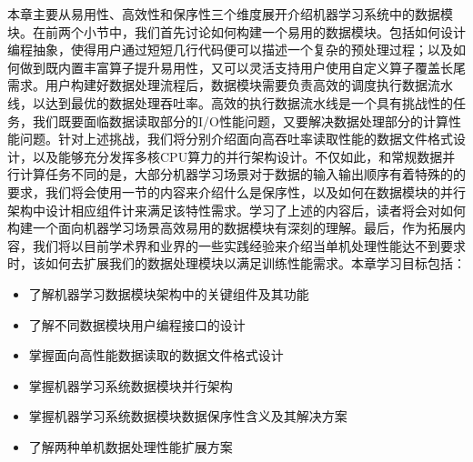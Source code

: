 \documentclass[letterpaper,10pt,english]{sphinxmanual}
\begin{document}
\sphinxAtStartPar
本章主要从易用性、高效性和保序性三个维度展开介绍机器学习系统中的数据模块。在前两个小节中，我们首先讨论如何构建一个易用的数据模块。包括如何设计编程抽象，使得用户通过短短几行代码便可以描述一个复杂的预处理过程；以及如何做到既内置丰富算子提升易用性，又可以灵活支持用户使用自定义算子覆盖长尾需求。用户构建好数据处理流程后，数据模块需要负责高效的调度执行数据流水线，以达到最优的数据处理吞吐率。高效的执行数据流水线是一个具有挑战性的任务，我们既要面临数据读取部分的I/O性能问题，又要解决数据处理部分的计算性能问题。针对上述挑战，我们将分别介绍面向高吞吐率读取性能的数据文件格式设计，以及能够充分发挥多核CPU算力的并行架构设计。不仅如此，和常规数据并行计算任务不同的是，大部分机器学习场景对于数据的输入输出顺序有着特殊的的要求，我们将会使用一节的内容来介绍什么是保序性，以及如何在数据模块的并行架构中设计相应组件计来满足该特性需求。学习了上述的内容后，读者将会对如何构建一个面向机器学习场景高效易用的数据模块有深刻的理解。最后，作为拓展内容，我们将以目前学术界和业界的一些实践经验来介绍当单机处理性能达不到要求时，该如何去扩展我们的数据处理模块以满足训练性能需求。本章学习目标包括：
\begin{itemize}
\item {} 
\sphinxAtStartPar
了解机器学习数据模块架构中的关键组件及其功能

\item {} 
\sphinxAtStartPar
了解不同数据模块用户编程接口的设计

\item {} 
\sphinxAtStartPar
掌握面向高性能数据读取的数据文件格式设计

\item {} 
\sphinxAtStartPar
掌握机器学习系统数据模块并行架构

\item {} 
\sphinxAtStartPar
掌握机器学习系统数据模块数据保序性含义及其解决方案

\item {} 
\sphinxAtStartPar
了解两种单机数据处理性能扩展方案

\end{itemize}
\end{document}
